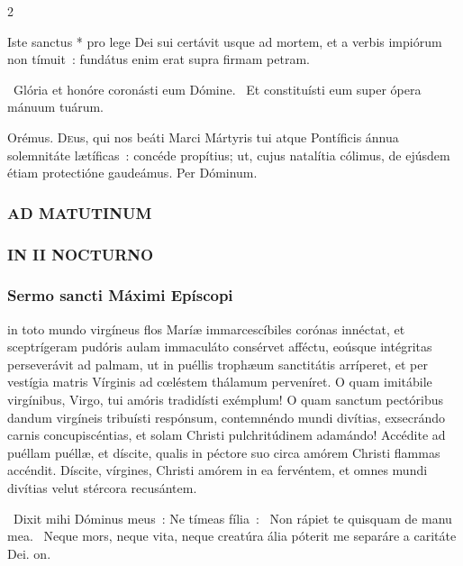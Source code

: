 \documentclass[9pt,twoside]{extarticle}
\begin{document}
\begin{multicols}{2}
{\small {}}

 Iste sanctus * pro lege Dei sui certávit usque ad mortem, et a verbis impiórum non tímuit~: fundátus enim erat supra firmam petram.

~Glória et honóre coronásti eum Dómine. ~Et constituísti eum super ópera mánuum tuárum.

\smallskip
Orémus. \hfill {}
\lettrine{D}eus, qui nos beáti Marci Mártyris tui atque Pontíficis ánnua solemnitáte lætíficas~: concéde propítius; ut, cujus natalítia cólimus, de ejúsdem étiam protectióne gaudeámus. Per Dóminum.

\subsubsection*{\center \normalfont \textsc{AD MATUTINUM}}
\small {}

\normalsize
\subsubsection*{\center \normalfont \small \textsc{IN II NOCTURNO}}
\subsubsection*{\center \normalfont Sermo sancti Máximi Epíscopi\\ \small {}}
 in toto mundo virgíneus flos Maríæ immarcescíbiles corónas innéctat, et sceptrígeram pudóris aulam immaculáto consérvet afféctu, eoúsque intégritas perseverávit ad palmam, ut in puéllis trophæum sanctitátis arríperet, et per vestígia matris Vírginis ad cœléstem thálamum perveníret. O quam imitábile virgínibus, Virgo, tui amóris tradidísti exémplum! O quam sanctum pectóribus dandum virgíneis tribuísti respónsum, contemnéndo mundi divítias, exsecrándo carnis concupiscéntias, et solam Christi pulchritúdinem adamándo! Accédite ad puéllam puéllæ, et díscite, qualis in péctore suo circa amórem Christi flammas accéndit. Díscite, vírgines, Christi amórem in ea fervéntem, et omnes mundi divítias velut stércora recusántem.

~Dixit mihi Dóminus meus~: Ne tímeas fília~: \textred{*}~Non rápiet te quisquam de manu mea. ~Neque mors, neque vita, neque creatúra ália póterit me separáre a caritáte Dei. on.


\end{multicols}
\end{document}
